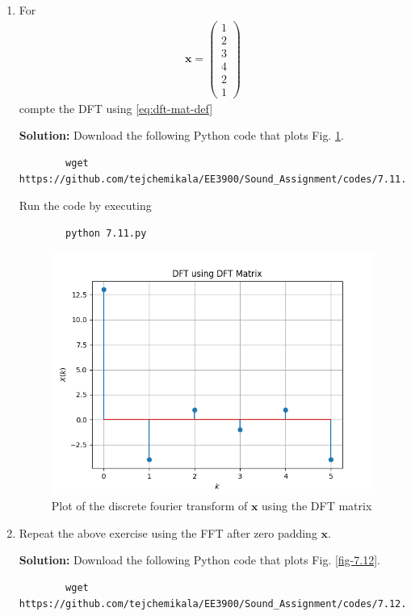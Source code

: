 \documentclass[journal,12pt,twocolumn]{IEEEtran}
\newcommand{\solution}{\noindent \textbf{Solution: }}
\let\vec\mathbf
\numberwithin{equation}{section}
\renewcommand\thesection{\arabic{section}}
\newcommand{\myvec}[1]{\ensuremath{\begin{pmatrix}#1\end{pmatrix}}}
\begin{document}
\begin{enumerate}[label=\thesection.\arabic*]
\item For 
    \begin{align}
	    \vec{x} = \myvec{1\\2\\3\\4\\2\\1}
        \label{eq:equation1}
    \end{align}
    compte the DFT  
		using 
	    \eqref{eq:dft-mat-def}
	    
	\solution Download the following Python code that plots Fig. \ref{fig-7.11}.
	\begin{lstlisting}
		wget https://github.com/tejchemikala/EE3900/Sound_Assignment/codes/7.11.py
	\end{lstlisting}
	
	Run the code by executing
	\begin{lstlisting}
		python 7.11.py
	\end{lstlisting}

	\begin{figure}[!ht]
		\centering
		\includegraphics[width=\columnwidth]{./figs/7.11.png}
		\caption{Plot of the discrete fourier transform of $\vec{x}$ using the DFT matrix}
		\label{fig-7.11}	
	\end{figure}
	
	
    \item Repeat the above exercise using the FFT
	    after zero padding $\vec{x}$.

	\solution Download the following Python code that plots Fig. \ref{fig-7.12}.
	\begin{lstlisting}
		wget https://github.com/tejchemikala/EE3900/Sound_Assignment/codes/7.12.py
	\end{lstlisting}
	

\end{enumerate}
\end{document}
